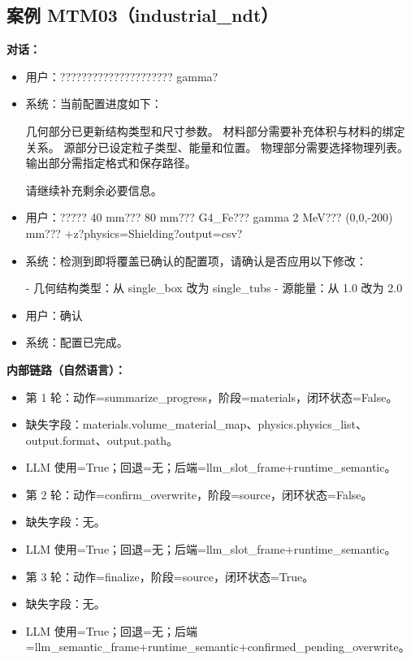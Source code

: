 \documentclass[11pt]{ctexart}
\begin{document}
\subsection{案例 MTM03（industrial\_ndt）}
\textbf{对话：}
\begin{itemize}
\item 用户：????????????????????? gamma?
\item 系统：当前配置进度如下：

几何部分已更新结构类型和尺寸参数。  
材料部分需要补充体积与材料的绑定关系。  
源部分已设定粒子类型、能量和位置。  
物理部分需要选择物理列表。  
输出部分需指定格式和保存路径。

请继续补充剩余必要信息。
\item 用户：????? 40 mm??? 80 mm??? G4\_Fe??? gamma 2 MeV??? (0,0,-200) mm??? +z?physics=Shielding?output=csv?
\item 系统：检测到即将覆盖已确认的配置项，请确认是否应用以下修改：

- 几何结构类型：从 single\_box 改为 single\_tubs
- 源能量：从 1.0 改为 2.0
\item 用户：确认
\item 系统：配置已完成。
\end{itemize}
\textbf{内部链路（自然语言）：}
\begin{itemize}
\item 第 1 轮：动作=summarize\_progress，阶段=materials，闭环状态=False。
\item 缺失字段：materials.volume\_material\_map、physics.physics\_list、output.format、output.path。
\item LLM 使用=True；回退=无；后端=llm\_slot\_frame+runtime\_semantic。
\item 第 2 轮：动作=confirm\_overwrite，阶段=source，闭环状态=False。
\item 缺失字段：无。
\item LLM 使用=True；回退=无；后端=llm\_slot\_frame+runtime\_semantic。
\item 第 3 轮：动作=finalize，阶段=source，闭环状态=True。
\item 缺失字段：无。
\item LLM 使用=True；回退=无；后端=llm\_semantic\_frame+runtime\_semantic+confirmed\_pending\_overwrite。
\end{itemize}
\end{document}

